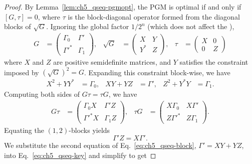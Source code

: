 \begin{proof}
    By Lemma~\ref{lem:ch5_qseq-pgmopt}, the PGM is optimal if and only if $[G, \tau] = 0$, where $\tau$ is the block-diagonal operator formed from the diagonal blocks of $\sqrt{G}$.
    Ignoring the global factor $1/2^n$ (which does not affect the \gammacomm{}),
    \begin{align}
        G &=
        \begin{pmatrix}
            \Gamma_0 & \Gamma' \\
            \Gamma'^{*} & \Gamma_1
        \end{pmatrix},
        &
        \sqrt{G} &=
        \begin{pmatrix}
            X & Y \\
            Y^{*} & Z
        \end{pmatrix},
        &
        \tau &=
        \begin{pmatrix}
            X & 0 \\
            0 & Z
        \end{pmatrix}
    \end{align}
    where $X$ and $Z$ are positive semidefinite matrices, and $Y$ satisfies the constraint imposed by $\left( \sqrt{G} \right)^2 = G$.
    Expanding this constraint block-wise, we have
    \begin{align}\label{eq:ch5_qseq-block}
        X^2 + Y Y^{*} &= \Gamma_0, &
        X Y + Y Z &= \Gamma', &
        Z^2 + Y^{*} Y &= \Gamma_1.
    \end{align}
    Computing both sides of $G\tau = \tau G$, we have
    \begin{align}
        G\tau &=
        \begin{pmatrix}
            \Gamma_0 X & \Gamma' Z \\
            \Gamma'^{*} X & \Gamma_1 Z
        \end{pmatrix},
        &
        \tau G &=
        \begin{pmatrix}
            X \Gamma_0 & X \Gamma' \\
            Z \Gamma'^{*} & Z \Gamma_1
        \end{pmatrix}.
    \end{align}
    Equating the $(1,2)$-blocks yields
    \begin{equation}\label{eq:ch5_qseq-key}
        \Gamma' Z = X \Gamma'.
    \end{equation}
    We substitute the second equation of Eq.~\eqref{eq:ch5_qseq-block}, $\Gamma' = XY + YZ$, into Eq.~\eqref{eq:ch5_qseq-key} and simplify to get

\end{proof}
